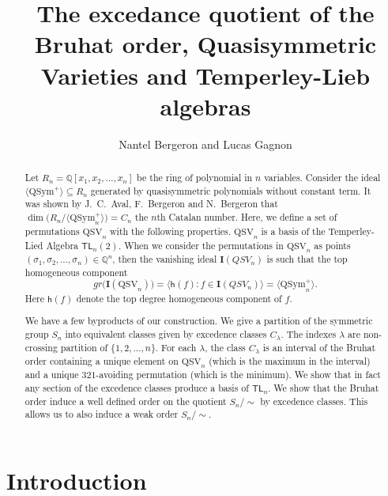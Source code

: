 \documentclass[12pt]{amsart}
\title{The excedance quotient of the Bruhat order, Quasisymmetric Varieties and Temperley-Lieb algebras}
\author{ Nantel Bergeron and Lucas Gagnon}
\date{}
\theoremstyle{definition}
\theoremstyle{remark}
\numberwithin{equation}{section}
\newcommand{\QQ}{\mathbb{Q}}
\newcommand{\TL}{\mathsf{TL}}
\newcommand{\QSym}{\mathrm{QSym}}
\newcommand{\QSV}{\mathrm{QSV}}
\begin{document}
\maketitle
\begin{abstract} Let $R_n=\QQ[x_1,x_2,\ldots,x_n]$ be the ring of polynomial in $n$ variables. Consider the ideal $\langle \QSym^+\rangle\subseteq R_n$ generated by quasisymmetric polynomials
without constant term. It was shown by J.~C.~Aval, F.~Bergeron and  N.~Bergeron that $\dim\big(R_n/\langle \QSym_{n}^{+} \rangle\big)=C_n$ the $n$th Catalan number. Here, we define a set of permutations $\QSV_n$ with the following properties. $\QSV_n$ is a basis of the Temperley-Lied Algebra $\TL_n(2)$. When we consider the permutations in $\QSV_n$ as points $(\sigma_1,\sigma_2,\ldots,\sigma_n)\in\QQ^n$, 
then the vanishing ideal $ \mathbf{I}(QSV_n)$ is such that the top homogeneous component 
$$gr\big(\mathbf{I}(\QSV_n)\big)=\big\langle \mathsf{h}(f): f\in \mathbf{I}(QSV_n)\big\rangle=\big\langle \QSym_{n}^{+} \big\rangle.$$ 
Here  $\mathsf{h}(f)$ denote the top degree homogeneous component of $f$.

We have a few byproducts of our construction. We give a partition of the symmetric group $S_n$ into equivalent classes given by excedence classes $C_\lambda$. The indexes $\lambda$ are non-crossing partition of $\{1,2,\ldots,n\}$. For each $\lambda$, the class $C_\lambda$ is an interval of the Bruhat order containing a unique element on $\QSV_n$ (which is the maximum in the interval) and a unique $321$-avoiding permutation (which is the minimum). We show that in fact any section of the excedence classes produce a basis of $\TL_n$. We show that the Bruhat order induce a well defined order on the quotient $S_n/\!\!\sim$ by excedence classes. This allows us to also induce a weak order $S_n/\!\!\sim$.
\end{abstract}

\section{Introduction}
\end{document}
